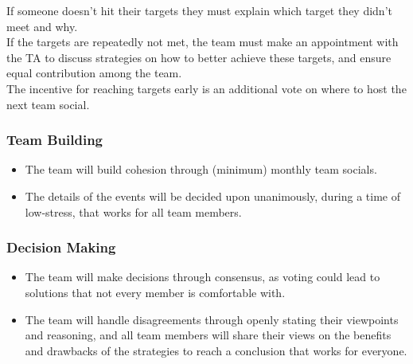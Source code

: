 \documentclass{article}
\begin{document}
If someone doesn't hit their targets they must explain which target they didn't meet and why.\\
\indent If the targets are repeatedly not met, the team must make an appointment with the TA to discuss strategies on
how to better achieve these targets, and ensure equal contribution among the team.\\
\indent The incentive for reaching targets early is an additional vote on where to host the next team social.\\

\subsubsection*{Team Building}
\begin{itemize}
  \item The team will build cohesion through (minimum) monthly team socials.
  \item The details of the events will be decided upon unanimously, during a time of low-stress,
  that works for all team members.
\end{itemize}

\subsubsection*{Decision Making} 
\begin{itemize}
  \item The team will make decisions through consensus, as voting could lead to solutions that
  not every member is comfortable with.
  \item The team will handle disagreements through openly stating their viewpoints and
  reasoning, and all team members will share their views on the benefits and drawbacks of
  the strategies to reach a conclusion that works for everyone.
\end{itemize}
\end{document}

